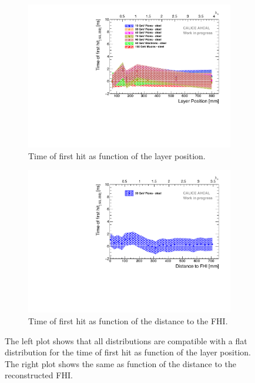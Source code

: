 \begin{figure}[htbp!]
	\begin{subfigure}[t]{0.5\textwidth}
		\centering
		\includegraphics[width=1\textwidth]{chap5/fig_AHCAL_timing/Pions/Timing_Depth_Comparison_ShortAsymRange.pdf}
		\caption{Time of first hit as function of the layer position.} \label{fig:Depth_Comparison}
	\end{subfigure}
	\hfill
	\begin{subfigure}[t]{0.5\textwidth}
		\centering
		\includegraphics[width=1\textwidth]{chap5/fig_AHCAL_timing/Pions/Timing_Depth_Comparison_ShortAsymRange_ShowerStart.pdf}
		\caption{Time of first hit as function of the distance to the FHI.}\label{fig:Depth_Comparison_FHI}
	\end{subfigure}
	\caption{The left plot shows that all distributions are compatible with a flat distribution for the time of first hit as function of the layer position. The right plot shows the same as function of the distance to the reconstructed FHI.}
	\label{fig:DepthProfile}
\end{figure}

